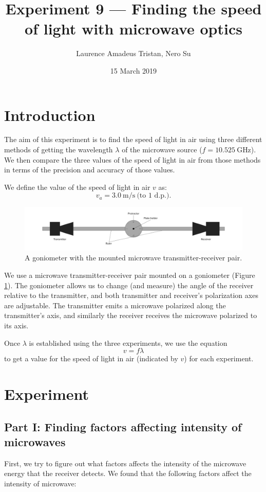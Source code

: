 \documentclass[letter,12pt]{article}
\title{Experiment 9 --- Finding the speed of light with microwave optics}
\author{Laurence Amadeus Tristan, Nero Su}
\date{15 March 2019}
\newcommand{\tlambda}{\(\lambda\) }
\numberwithin{equation}{section}
\numberwithin{figure}{section}
\numberwithin{table}{section}
\begin{document}
\maketitle

\section{Introduction}
The aim of this experiment is to find the speed of light in air using three different methods of getting the wavelength \tlambda of the microwave source (\(f = \SI{10.525}{\giga\hertz}\)). We then compare the three values of the speed of light in air from those methods in terms of the precision and accuracy of those values.

We define the value of the speed of light in air \(v\) as:
\[ v_a = \SI{3.0}{\metre\per\second} \ \text{(to 1 d.p.)}. \]

\begin{figure}[!ht]
  \centering
  \includegraphics[width=\textwidth]{goniometer.pdf}
  \caption{A goniometer with the mounted microwave transmitter-receiver pair.}
  \label{fig:i1}
\end{figure}

We use a microwave transmitter-receiver pair mounted on a goniometer (Figure \ref{fig:i1}). The goniometer allows us to change (and measure) the angle of the receiver relative to the transmitter, and both transmitter and receiver's polarization axes are adjustable. The transmitter emits a microwave polarized along the transmitter's axis, and similarly the receiver receives the microwave polarized to its axis.

Once \tlambda is established using the three experiments, we use the equation
\begin{equation}
  v = f \lambda
\end{equation}
to get a value for the speed of light in air (indicated by \(v\)) for each experiment.

\section{Experiment}
\subsection{Part I: Finding factors affecting intensity of microwaves}
First, we try to figure out what factors affects the intensity of the microwave energy that the receiver detects. We found that the following factors affect the intensity of microwave:
\end{document}
